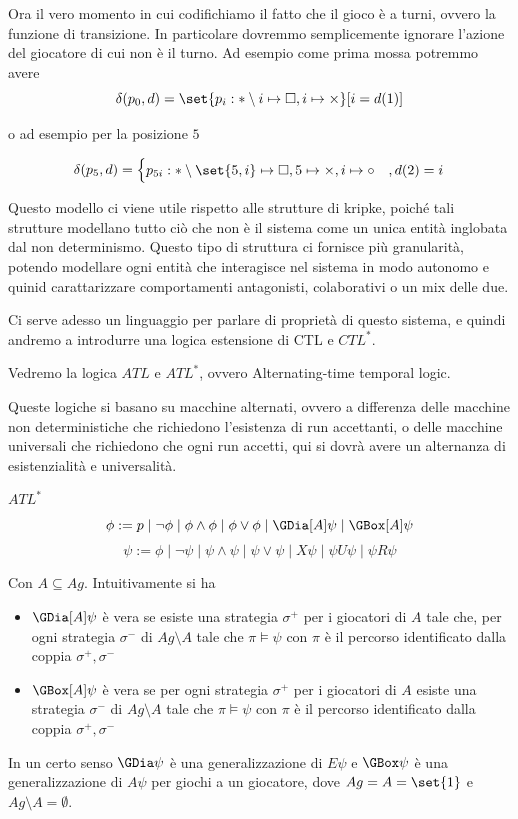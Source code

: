 Ora il vero momento in cui codifichiamo il fatto che il gioco è a turni, ovvero la funzione di transizione. In particolare dovremmo semplicemente ignorare l'azione del giocatore di cui non è il turno.
Ad esempio come prima mossa potremmo avere
\[\delta(p_0, d) = \set{p_i: *\setminus i \mapsto \square, i \mapsto \times}[ i = d(1)]\]

o ad esempio per la posizione \(5\)

\[\delta(p_5, d) = \begin{cases}
  p_{5i}: * \setminus \set{5,i} \mapsto \square, 5 \mapsto \times, i \mapsto \circ & ,d(2) = i \\
\end{cases}\]

Questo modello ci viene utile rispetto alle strutture di kripke, poiché tali strutture modellano tutto ciò che non è il sistema come un unica entità inglobata dal non determinismo. Questo tipo di struttura ci fornisce più granularità, potendo modellare ogni entità che interagisce nel sistema in modo autonomo e quinid carattarizzare comportamenti antagonisti, colaborativi o un mix delle due.

Ci serve adesso un linguaggio per parlare di proprietà di questo sistema, e quindi andremo a introdurre una logica estensione di CTL e \(CTL^*\).

Vedremo la logica \(ATL\) e \(ATL^*\), ovvero Alternating-time temporal logic.

Queste logiche si basano su macchine alternati, ovvero a differenza delle macchine non deterministiche che richiedono l'esistenza di run accettanti, o delle macchine universali che richiedono che ogni run accetti, qui si dovrà avere un alternanza di esistenzialità e universalità.

\begin{definition}{\(ATL^*\)}
  \[\phi := p \mid \neg \phi \mid \phi \land \phi \mid \phi \lor \phi \mid \GDia[A]\psi \mid \GBox[A] \psi\]
  \[\psi := \phi \mid \neg \psi \mid \psi \land \psi \mid \psi \lor \psi \mid X\psi \mid \psi U\psi \mid \psi R \psi\]

  Con \(A \subseteq Ag\). Intuitivamente si ha
  \begin{itemize}
    \item \(\GDia[A] \psi\) è vera se esiste una strategia \(\sigma^+\) per i giocatori di \(A\) tale che, per ogni strategia \(\sigma^-\) di \(Ag\setminus A\) tale che \(\pi\models \psi\) con \(\pi\) è il percorso identificato dalla coppia \(\sigma^+, \sigma^-\)
    \item \(\GBox[A] \psi\) è vera se per ogni strategia \(\sigma^+\) per i giocatori di \(A\) esiste una strategia \(\sigma^-\) di \(Ag\setminus A\) tale che \(\pi\models \psi\) con \(\pi\) è il percorso identificato dalla coppia \(\sigma^+, \sigma^-\)
  \end{itemize}

  In un certo senso \(\GDia \psi\) è una generalizzazione di \(E\psi\) e \(\GBox \psi\) è una generalizzazione di \(A\psi\) per giochi a un giocatore, dove \(Ag = A = \set{1}\) e \(Ag\setminus A = \emptyset\).
\end{definition}

